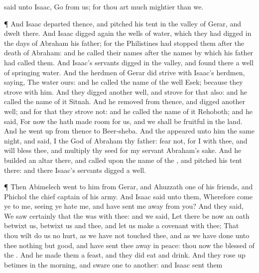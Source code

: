 {said unto
Isaac,
Go from us; for thou art
much
mightier than we.
\par }{\PP {}¶ And
Isaac
departed thence, and pitched his
tent in the
valley of
Gerar, and
dwelt
there.
And
Isaac
digged
again the
wells of
water, which they had
digged in the
days of
Abraham his
father; for the
Philistines had
stopped them
after the
death of
Abraham: and he
called their
names after the
names by
which his
father had
called them.
And
Isaac’s
servants
digged in the
valley, and
found there a
well of
springing
water.
And the
herdmen of
Gerar did
strive with
Isaac’s
herdmen,
saying, The
water
{} ours: and he
called the
name of the
well
Esek; because they
strove with him.
And they
digged
another
well, and
strove for that also: and he
called the name of
it
Sitnah.
And he
removed from thence, and
digged
another
well; and for that they
strove not: and he
called the name of
it
Rehoboth; and he
said, For
now the
{} hath made
room for us, and we shall be
fruitful in the
land.
And he went
up from thence to
Beer-sheba.
And the
{}
appeared unto him the same
night, and
said, I
{} the
God of
Abraham thy
father:
fear not, for I
{}
with thee, and will
bless thee, and
multiply thy
seed for my
servant
Abraham’s sake.
And he
builded an
altar there, and
called upon the
name of the
{}, and
pitched his
tent there: and there
Isaac’s
servants
digged a
well.
\par }{\PP {}¶ Then
Abimelech
went to him from
Gerar, and
Ahuzzath one of his
friends, and
Phichol the chief
captain of his
army.
And
Isaac
said unto them,
Wherefore
come ye to me, seeing ye
hate me, and have sent me
away from you?
And they
said, We
saw
certainly that the
{} was with thee: and we
said, Let there be now an
oath
betwixt us,
{}
betwixt us and thee, and let us
make a
covenant with thee;
That thou wilt
do us no
hurt, as we have not
touched thee, and as we have
done unto thee nothing
but
good, and have sent thee
away in
peace: thou
{}
now the
blessed of the
{}.
And he
made them a
feast, and they did
eat and
drink.
And they rose up
betimes in the
morning, and
sware
one to
another: and
Isaac sent them
}
